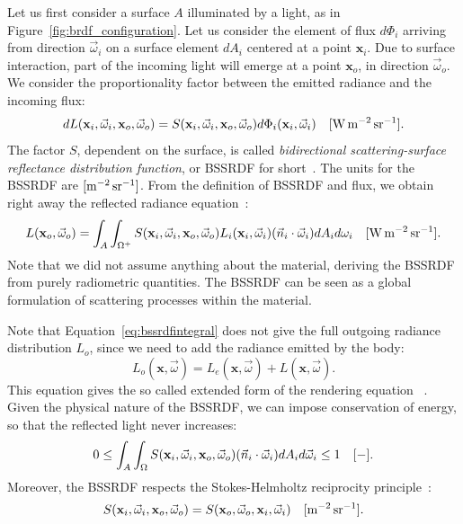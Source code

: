 Let us first consider a surface $A$ illuminated by a light, as in Figure~\ref{fig:brdf_configuration}. Let us consider the element of flux $d\Phi_i$ arriving from direction $\vec{\omega}_i$ on a surface element $d A_i$ centered at a point $\mathbf{x}_i$. Due to surface interaction, part of the incoming light will emerge at a point $\mathbf{x}_o$, in direction $\vec{\omega}_o$. We consider the proportionality factor between the emitted radiance and the incoming flux:
\begin{equation}
\label{eq:bssrdf}
d L(\mathbf{x}_i, \vec{\omega}_i, \mathbf{x}_o, \vec{\omega}_o) = S(\mathbf{x}_i, \vec{\omega}_i, \mathbf{x}_o, \vec{\omega}_o) d \Phi_i(\mathbf{x}_i, \vec{\omega}_i)  \siunit{\watt \per \square \metre \per \steradian}.
\end{equation}
The factor $S$, dependent on the surface, is called \emph{bidirectional scattering-surface reflectance distribution function}, or BSSRDF for short~\cite{Nicodemus1977}. The units for the BSSRDF are $\siunitnospace{\per \square \metre \per \steradian}$. From the definition of BSSRDF and flux, we obtain right away the reflected radiance equation~\cite{Jensen2001}:
\begin{equation}
\label{eq:bssrdfintegral}
L(\mathbf{x}_o, \vec{\omega}_o) = \int_A \int_{\Omega^+} S(\mathbf{x}_i, \vec{\omega}_i, \mathbf{x}_o, \vec{\omega}_o) L_i(\mathbf{x}_i, \vec{\omega}_i) (\vec{n}_i \cdot \vec{\omega}_i) d A_i d {\omega}_i  \siunit{\watt \per \square \metre \per \steradian}.
\end{equation}
Note that we did not assume anything about the material, deriving the BSSRDF from purely radiometric quantities. The BSSRDF can be seen as a global formulation of scattering processes within the material.

Note that Equation~\ref{eq:bssrdfintegral} does not give the full outgoing radiance distribution $L_o$, since we need to add the radiance emitted by the body:
\begin{equation*}
L_o(\mathbf{x}, \vec{\omega}) = L_e(\mathbf{x}, \vec{\omega}) + L(\mathbf{x}, \vec{\omega}) .
\label{eq:renderingequation}
\end{equation*}
This equation gives the so called extended form of the rendering equation ~\cite{Jensen2001}. Given the physical nature of the BSSRDF, we can impose conservation of energy, so that the reflected light never increases:
\begin{equation}
\label{eq:bssrdfconservation}
0 \leq \int_A \int_\Omega S(\mathbf{x}_i, \vec{\omega}_i, \mathbf{x}_o, \vec{\omega}_o) (\vec{n}_i \cdot \vec{\omega}_i) d A_i d \vec{\omega}_i \leq 1 \ \ \ [\SI{}{-}].
\end{equation}
Moreover, the BSSRDF respects the Stokes-Helmholtz reciprocity principle~\cite{stokes_2009,Chandrasekhar1958}:
\begin{equation}
\label{eq:bssrdfreciprocity}
S(\mathbf{x}_i, \vec{\omega}_i, \mathbf{x}_o, \vec{\omega}_o) = 
S(\mathbf{x}_o, \vec{\omega}_o, \mathbf{x}_i, \vec{\omega}_i)  \siunit{\per \square \metre \per \steradian}.
\end{equation}

